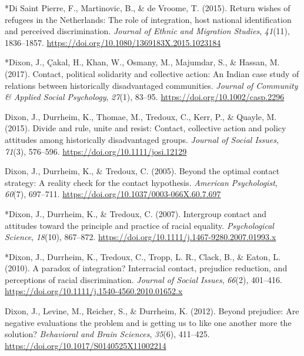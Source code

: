 \documentclass[12pt, letterpaper]{article}
\begin{document}
\leavevmode\hypertarget{ref-1807}{}%
*Di Saint Pierre, F., Martinovic, B., \& de Vroome, T. (2015). Return
wishes of refugees in the Netherlands: The role of integration, host
national identification and perceived discrimination. \emph{Journal of
Ethnic and Migration Studies}, \emph{41}(11), 1836--1857.
\url{https://doi.org/10.1080/1369183X.2015.1023184}

\leavevmode\hypertarget{ref-93}{}%
*Dixon, J., Çakal, H., Khan, W., Osmany, M., Majumdar, S., \& Hassan, M.
(2017). Contact, political solidarity and collective action: An Indian
case study of relations between historically disadvantaged communities.
\emph{Journal of Community \& Applied Social Psychology}, \emph{27}(1),
83--95. \url{https://doi.org/10.1002/casp.2296}

\leavevmode\hypertarget{ref-dixon_divide_2015}{}%
Dixon, J., Durrheim, K., Thomae, M., Tredoux, C., Kerr, P., \& Quayle,
M. (2015). Divide and rule, unite and resist: Contact, collective action
and policy attitudes among historically disadvantaged groups.
\emph{Journal of Social Issues}, \emph{71}(3), 576--596.
\url{https://doi.org/10.1111/josi.12129}

\leavevmode\hypertarget{ref-dixon_beyond_2005}{}%
Dixon, J., Durrheim, K., \& Tredoux, C. (2005). Beyond the optimal
contact strategy: A reality check for the contact hypothesis.
\emph{American Psychologist}, \emph{60}(7), 697--711.
\url{https://doi.org/10.1037/0003-066X.60.7.697}

\leavevmode\hypertarget{ref-1386}{}%
*Dixon, J., Durrheim, K., \& Tredoux, C. (2007). Intergroup contact and
attitudes toward the principle and practice of racial equality.
\emph{Psychological Science}, \emph{18}(10), 867--872.
\url{https://doi.org/10.1111/j.1467-9280.2007.01993.x}

\leavevmode\hypertarget{ref-336}{}%
*Dixon, J., Durrheim, K., Tredoux, C., Tropp, L. R., Clack, B., \&
Eaton, L. (2010). A paradox of integration? Interracial contact,
prejudice reduction, and perceptions of racial discrimination.
\emph{Journal of Social Issues}, \emph{66}(2), 401--416.
\url{https://doi.org/10.1111/j.1540-4560.2010.01652.x}

\leavevmode\hypertarget{ref-dixon_beyond_2012}{}%
Dixon, J., Levine, M., Reicher, S., \& Durrheim, K. (2012). Beyond
prejudice: Are negative evaluations the problem and is getting us to
like one another more the solution? \emph{Behavioral and Brain
Sciences}, \emph{35}(6), 411--425.
\url{https://doi.org/10.1017/S0140525X11002214}
\end{document}
